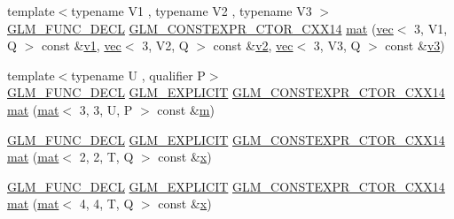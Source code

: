 \begin{DoxyCompactItemize}
\item 
{\footnotesize template$<$typename V1 , typename V2 , typename V3 $>$ }\\\hyperlink{setup_8hpp_ab2d052de21a70539923e9bcbf6e83a51}{G\+L\+M\+\_\+\+F\+U\+N\+C\+\_\+\+D\+E\+CL} \hyperlink{setup_8hpp_a0900f9145e68bf6061b6f5e7be3fa751}{G\+L\+M\+\_\+\+C\+O\+N\+S\+T\+E\+X\+P\+R\+\_\+\+C\+T\+O\+R\+\_\+\+C\+X\+X14} \hyperlink{structglm_1_1mat_3_013_00_013_00_01_t_00_01_q_01_4_ae25c721fb8fd4496b8430fc9040b04be}{mat} (\hyperlink{structglm_1_1vec}{vec}$<$ 3, V1, Q $>$ const \&\hyperlink{_s_d_l__opengl__glext_8h_a435c176a02c061b43e19bdf7c86cceae}{v1}, \hyperlink{structglm_1_1vec}{vec}$<$ 3, V2, Q $>$ const \&\hyperlink{_s_d_l__opengl__glext_8h_a0928f6d0f0f794ba000a21dfae422136}{v2}, \hyperlink{structglm_1_1vec}{vec}$<$ 3, V3, Q $>$ const \&\hyperlink{_s_d_l__opengl__glext_8h_acc806b31cbf466ceba6555983d8b814d}{v3})
\item 
{\footnotesize template$<$typename U , qualifier P$>$ }\\\hyperlink{setup_8hpp_ab2d052de21a70539923e9bcbf6e83a51}{G\+L\+M\+\_\+\+F\+U\+N\+C\+\_\+\+D\+E\+CL} \hyperlink{setup_8hpp_a6c74f5a5e7b134ab69023ff9a30d4d5d}{G\+L\+M\+\_\+\+E\+X\+P\+L\+I\+C\+IT} \hyperlink{setup_8hpp_a0900f9145e68bf6061b6f5e7be3fa751}{G\+L\+M\+\_\+\+C\+O\+N\+S\+T\+E\+X\+P\+R\+\_\+\+C\+T\+O\+R\+\_\+\+C\+X\+X14} \hyperlink{structglm_1_1mat_3_013_00_013_00_01_t_00_01_q_01_4_aaaa9738e2310481af8ab062744c2c426}{mat} (\hyperlink{structglm_1_1mat}{mat}$<$ 3, 3, U, P $>$ const \&\hyperlink{_s_d_l__opengl__glext_8h_af593500c283bf1a787a6f947f503a5c2}{m})
\item 
\hyperlink{setup_8hpp_ab2d052de21a70539923e9bcbf6e83a51}{G\+L\+M\+\_\+\+F\+U\+N\+C\+\_\+\+D\+E\+CL} \hyperlink{setup_8hpp_a6c74f5a5e7b134ab69023ff9a30d4d5d}{G\+L\+M\+\_\+\+E\+X\+P\+L\+I\+C\+IT} \hyperlink{setup_8hpp_a0900f9145e68bf6061b6f5e7be3fa751}{G\+L\+M\+\_\+\+C\+O\+N\+S\+T\+E\+X\+P\+R\+\_\+\+C\+T\+O\+R\+\_\+\+C\+X\+X14} \hyperlink{structglm_1_1mat_3_013_00_013_00_01_t_00_01_q_01_4_a2833b6b50e5dbd02022a152be73cf83f}{mat} (\hyperlink{structglm_1_1mat}{mat}$<$ 2, 2, T, Q $>$ const \&\hyperlink{_s_d_l__opengl_8h_ad0e63d0edcdbd3d79554076bf309fd47}{x})
\item 
\hyperlink{setup_8hpp_ab2d052de21a70539923e9bcbf6e83a51}{G\+L\+M\+\_\+\+F\+U\+N\+C\+\_\+\+D\+E\+CL} \hyperlink{setup_8hpp_a6c74f5a5e7b134ab69023ff9a30d4d5d}{G\+L\+M\+\_\+\+E\+X\+P\+L\+I\+C\+IT} \hyperlink{setup_8hpp_a0900f9145e68bf6061b6f5e7be3fa751}{G\+L\+M\+\_\+\+C\+O\+N\+S\+T\+E\+X\+P\+R\+\_\+\+C\+T\+O\+R\+\_\+\+C\+X\+X14} \hyperlink{structglm_1_1mat_3_013_00_013_00_01_t_00_01_q_01_4_a155ae99862b9e225d1b753208176f758}{mat} (\hyperlink{structglm_1_1mat}{mat}$<$ 4, 4, T, Q $>$ const \&\hyperlink{_s_d_l__opengl_8h_ad0e63d0edcdbd3d79554076bf309fd47}{x})

\end{DoxyCompactItemize}
